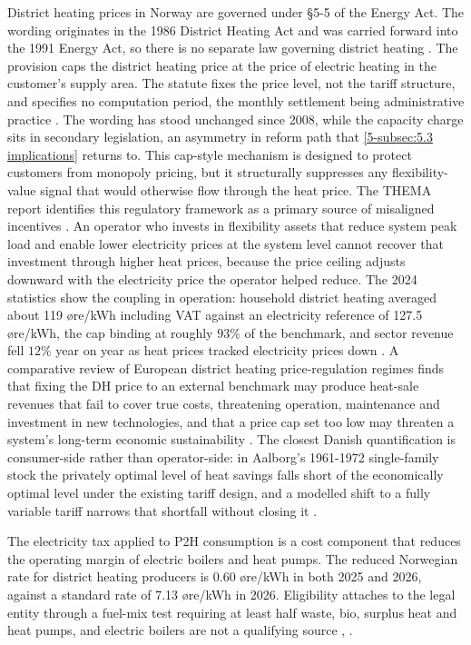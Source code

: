 District heating prices in Norway are governed under §5-5 of the Energy Act. The wording originates in the 1986 District Heating Act and was carried forward into the 1991 Energy Act, so there is no separate law governing district heating \cite{nve_nves_2024}. The provision caps the district heating price at the price of electric heating in the customer's supply area. The statute fixes the price level, not the tariff structure, and specifies no computation period, the monthly settlement being administrative practice \cite{energidepartementet_lov_1991}. The wording has stood unchanged since 2008, while the capacity charge sits in secondary legislation, an asymmetry in reform path that \autoref{5-subsec:5.3 implications} returns to. This cap-style mechanism is designed to protect customers from monopoly pricing, but it structurally suppresses any flexibility-value signal that would otherwise flow through the heat price. The THEMA report identifies this regulatory framework as a primary source of misaligned incentives \cite{Thema_fjernvarme_2024}. An operator who invests in flexibility assets that reduce system peak load and enable lower electricity prices at the system level cannot recover that investment through higher heat prices, because the price ceiling adjusts downward with the electricity price the operator helped reduce. The 2024 statistics show the coupling in operation: household district heating averaged about 119 øre/kWh including VAT against an electricity reference of 127.5 øre/kWh, the cap binding at roughly $93\%$ of the benchmark, and sector revenue fell $12\%$ year on year as heat prices tracked electricity prices down \cite{boeng_mindre_2025}. A comparative review of European district heating price-regulation regimes finds that fixing the DH price to an external benchmark may produce heat-sale revenues that fail to cover true costs, threatening operation, maintenance and investment in new technologies, and that a price cap set too low may threaten a system's long-term economic sustainability \cite{odgaarda_review_2020}. The closest Danish quantification is consumer-side rather than operator-side: in Aalborg's 1961-1972 single-family stock the privately optimal level of heat savings falls short of the economically optimal level under the existing tariff design, and a modelled shift to a fully variable tariff narrows that shortfall without closing it \cite{djorup_district_2020}.

The electricity tax applied to P2H consumption is a cost component that reduces the operating margin of electric boilers and heat pumps. The reduced Norwegian rate for district heating producers is 0.60 øre/kWh in both 2025 and 2026, against a standard rate of 7.13 øre/kWh in 2026. Eligibility attaches to the legal entity through a fuel-mix test requiring at least half waste, bio, surplus heat and heat pumps, and electric boilers are not a qualifying source \cite{stortinget_stortingsvedtak_nodate}, \cite{the_norwegian_tax_administration_arsrundskriv_nodate}.


